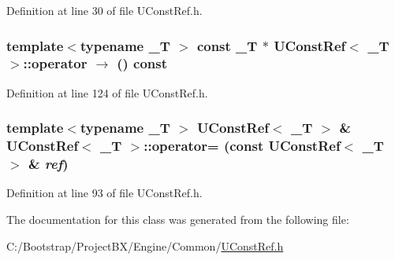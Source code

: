Definition at line 30 of file UConstRef.h.\hypertarget{class_u_const_ref_435e93126a837aea7e947348bf76c53d}{
\subsubsection[{operator-$>$}]{\setlength{\rightskip}{0pt plus 5cm}template$<$typename \_\-T $>$ const \_\-T $\ast$ {\bf UConstRef}$<$ \_\-T $>$::operator $\rightarrow$  () const}}
\label{class_u_const_ref_435e93126a837aea7e947348bf76c53d}




Definition at line 124 of file UConstRef.h.\hypertarget{class_u_const_ref_2fba377b5304cf356746771ecd97e95c}{
\subsubsection[{operator=}]{\setlength{\rightskip}{0pt plus 5cm}template$<$typename \_\-T $>$ {\bf UConstRef}$<$ \_\-T $>$ \& {\bf UConstRef}$<$ \_\-T $>$::operator= (const {\bf UConstRef}$<$ \_\-T $>$ \& {\em ref})}}
\label{class_u_const_ref_2fba377b5304cf356746771ecd97e95c}




Definition at line 93 of file UConstRef.h.

The documentation for this class was generated from the following file:\begin{CompactItemize}
\item 
C:/Bootstrap/ProjectBX/Engine/Common/\hyperlink{_u_const_ref_8h}{UConstRef.h}\end{CompactItemize}

